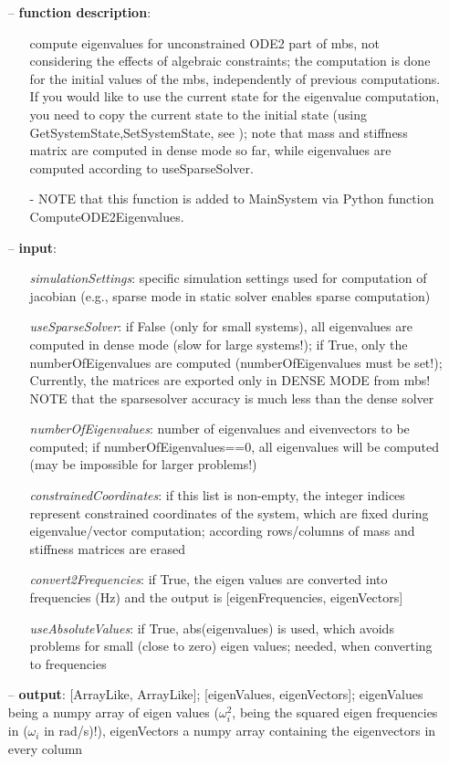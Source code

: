 \begin{itemize}[leftmargin=0.7cm]
\item[--]
{\bf function description}: \vspace{-6pt}
\begin{itemize}[leftmargin=1.2cm]
\setlength{\itemindent}{-0.7cm}
\item[]compute eigenvalues for unconstrained ODE2 part of mbs, not considering the effects of algebraic constraints; the computation is done for the initial values of the mbs, independently of previous computations. If you would like to use the current state for the eigenvalue computation, you need to copy the current state to the initial state (using GetSystemState,SetSystemState, see ); note that mass and stiffness matrix are computed in dense mode so far, while eigenvalues are computed according to useSparseSolver.
\item[]- NOTE that this function is added to MainSystem via Python function ComputeODE2Eigenvalues.
\end{itemize}
\item[--]
{\bf input}: \vspace{-6pt}
\begin{itemize}[leftmargin=1.2cm]
\setlength{\itemindent}{-0.7cm}
\item[]{\it simulationSettings}: specific simulation settings used for computation of jacobian (e.g., sparse mode in static solver enables sparse computation)
\item[]{\it useSparseSolver}: if False (only for small systems), all eigenvalues are computed in dense mode (slow for large systems!); if True, only the numberOfEigenvalues are computed (numberOfEigenvalues must be set!); Currently, the matrices are exported only in DENSE MODE from mbs! NOTE that the sparsesolver accuracy is much less than the dense solver
\item[]{\it numberOfEigenvalues}: number of eigenvalues and eivenvectors to be computed; if numberOfEigenvalues==0, all eigenvalues will be computed (may be impossible for larger problems!)
\item[]{\it constrainedCoordinates}: if this list is non-empty, the integer indices represent constrained coordinates of the system, which are fixed during eigenvalue/vector computation; according rows/columns of mass and stiffness matrices are erased
\item[]{\it convert2Frequencies}: if True, the eigen values are converted into frequencies (Hz) and the output is [eigenFrequencies, eigenVectors]
\item[]{\it useAbsoluteValues}: if True, abs(eigenvalues) is used, which avoids problems for small (close to zero) eigen values; needed, when converting to frequencies
\end{itemize}
\item[--]
{\bf output}: [ArrayLike, ArrayLike]; [eigenValues, eigenVectors]; eigenValues being a numpy array of eigen values ($\omega_i^2$, being the squared eigen frequencies in ($\omega_i$ in rad/s)!), eigenVectors a numpy array containing the eigenvectors in every column
\vspace{12pt}\end{itemize}
%

